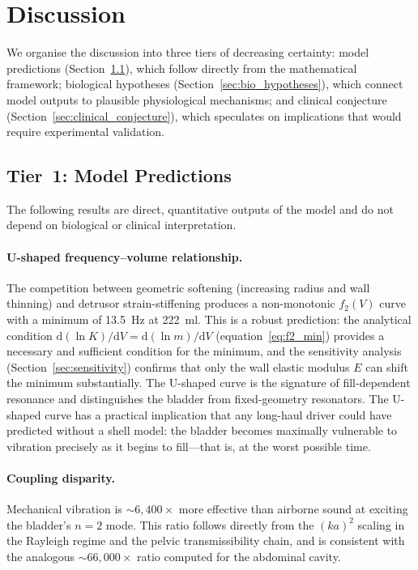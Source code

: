\section{Discussion}
\label{sec:discussion}

We organise the discussion into three tiers of decreasing certainty:
model predictions (Section~\ref{sec:model_predictions}), which follow
directly from the mathematical framework; biological hypotheses
(Section~\ref{sec:bio_hypotheses}), which connect model outputs to
plausible physiological mechanisms; and clinical conjecture
(Section~\ref{sec:clinical_conjecture}), which speculates on
implications that would require experimental validation.


\subsection{Tier~1: Model Predictions}
\label{sec:model_predictions}

The following results are direct, quantitative outputs of the model and
do not depend on biological or clinical interpretation.

\paragraph{U-shaped frequency--volume relationship.}
The competition between geometric softening (increasing radius and wall
thinning) and detrusor strain-stiffening produces a non-monotonic $f_2(V)$
curve with a minimum of \SI{13.5}{\hertz} at \SI{222}{\milli\litre}.  This
is a robust prediction: the analytical condition
$\mathrm{d}(\ln K)/\mathrm{d}V = \mathrm{d}(\ln m)/\mathrm{d}V$
(equation~\ref{eq:f2_min}) provides a necessary and sufficient condition for
the minimum, and the sensitivity analysis (Section~\ref{sec:sensitivity})
confirms that only the wall elastic modulus $E$ can shift the minimum
substantially.  The U-shaped curve is the signature of fill-dependent
resonance and distinguishes the bladder from fixed-geometry resonators.
The U-shaped curve has a practical implication that any long-haul driver
could have predicted without a shell model: the bladder becomes maximally
vulnerable to vibration precisely as it begins to fill---that is, at the
worst possible time.

\paragraph{Coupling disparity.}
Mechanical vibration is $\sim$$6{,}400\times$ more effective than airborne
sound at exciting the bladder's $n = 2$ mode.  This ratio follows directly
from the $(ka)^2$ scaling in the Rayleigh regime and the pelvic
transmissibility chain, and is consistent with the analogous
$\sim$$66{,}000\times$ ratio computed for the abdominal cavity.

